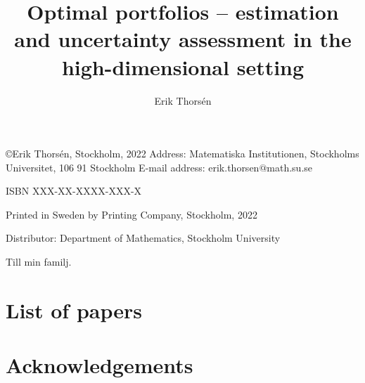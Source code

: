 \documentclass[12pt, oneside]{book}\usepackage{knitr}
\title{Optimal portfolios -- estimation and uncertainty assessment in the high-dimensional setting}
\author{Erik Thorsén}
\date{}
\makeatletter
\newcommand{\email}{erik.thorsen$@$math.su.se}
\newcommand{\auth}{Erik Thorsén}
\newcommand{\yr}{2022}
\newcommand{\address}{Matematiska Institutionen, Stockholms Universitet, 106 91 Stockholm}
\makeatother
\begin{document}
\frontmatterSU

\maketitle


\newpage


\phantom{.}


{\fontfamily{\familydefault}\selectfont
{\scriptsize
\noindent
\copyright \auth, Stockholm, \yr %
\newline
Address: \address
\newline
E-mail address: \email
 
\vspace{5mm}
\noindent
ISBN XXX-XX-XXXX-XXX-X %

\vspace{5mm}
\noindent
Printed in Sweden by Printing Company, Stockholm, \yr %

\noindent
Distributor: Department of Mathematics, Stockholm University %
}
}
\cleardoublepage

% 

\begin{dedication}
{\selectfont
{\Large
Till min familj.
}
}
\end{dedication}

\chapter*{List of papers}


\chapter*{Acknowledgements}

\end{document}
